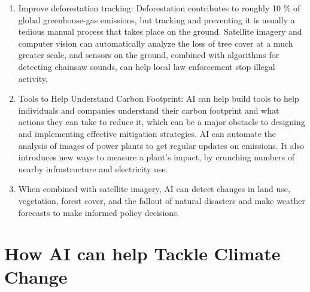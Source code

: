 \documentclass[12pt]{article}
\begin{document}
\begin{enumerate}

\item  Improve deforestation tracking:
Deforestation contributes to roughly 10 \% of global greenhouse-gas emissions, but tracking and preventing it is usually a tedious manual process that takes place on the ground. Satellite imagery and computer vision can automatically analyze the loss of tree cover at a much greater scale, and sensors on the ground, combined with algorithms for detecting chainsaw sounds, can help local law enforcement stop illegal activity.

\item Tools to Help Understand Carbon Footprint:
AI can help build tools to help individuals and companies understand their carbon footprint and what actions they can take to reduce it, which can be a major obstacle to designing and implementing effective mitigation strategies. AI can automate the analysis of images of power plants to get regular updates on emissions. It also introduces new ways to measure a plant’s impact, by crunching numbers of nearby infrastructure and electricity use.

\item When combined with satellite imagery, AI can detect changes in land use, vegetation, forest cover, and the fallout of natural disasters and make weather forecasts to make informed policy decisions.


\end{enumerate}

\section*{How AI can help Tackle Climate Change}
\end{document}
